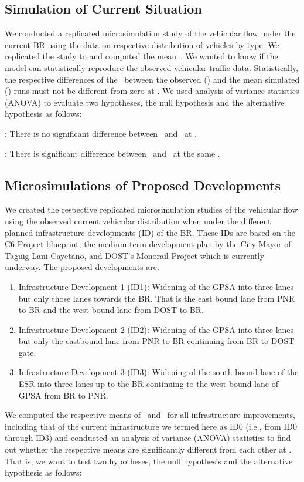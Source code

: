 \documentclass[preprint]{./acm_proc_article-sp}
\begin{document}
\subsection{Simulation of Current Situation}

We conducted a replicated microsimulation study of the vehicular flow under the current BR using the data on respective distribution of vehicles by type. We replicated the study to  and computed the mean~. We wanted to know if the model can statistically reproduce the observed vehicular traffic data. Statistically, the respective differences of the~ between the observed () and the mean simulated () runs must not be different from zero at . We used analysis of variance statistics (ANOVA) to evaluate two hypotheses, the null hypothesis  and the alternative hypothesis  as follows:

: There is no significant difference between~ and~ at .

: There is significant difference between~ and~ at the same .

\subsection{Microsimulations of Proposed Developments}

We created the respective replicated  microsimulation studies of the vehicular flow using the observed current vehicular distribution when under the different planned infrastructure developments (ID) of the BR. These IDs are based on the C6 Project blueprint, the medium-term development plan by the City Mayor of Taguig Lani Cayetano, and DOST's Monorail Project which is currently underway. The proposed developments are:
\begin{enumerate}
\item Infrastructure Development 1 (ID1): Widening of the GPSA into three lanes but only those lanes towards the BR. That is the east bound lane from PNR to BR and the west bound lane from DOST to BR.
\item Infrastructure Development 2 (ID2): Widening of the GPSA into three lanes but only the eastbound lane from PNR to BR continuing from BR to DOST gate.
\item Infrastructure Development 3 (ID3): Widening of the south bound lane of the ESR into three lanes up to the BR continuing to the west bound lane of GPSA from BR to PNR.
\end{enumerate}
We computed the respective means of~ and~ for all infrastructure improvements, including that of the current infrastructure we termed here as ID0 (i.e., from ID0 through ID3) and conducted an analysis of variance (ANOVA) statistics to find out whether the respective means are significantly different from each other at . That is, we want to test two hypotheses, the null hypothesis  and the alternative hypothesis  as follows:
\end{document}
